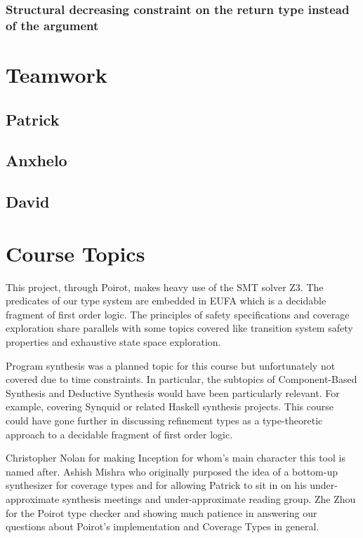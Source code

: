 \documentclass[review, sigplan]{acmart}
\begin{document}
\subsubsection{Structural decreasing constraint on the return type instead of the argument}

\section{Teamwork}

\subsection{Patrick}

\subsection{Anxhelo}

\subsection{David}

\section{Course Topics}
This project, through Poirot, makes heavy use of the SMT solver Z3. The
predicates of our type system are embedded in EUFA which is a decidable fragment
of first order logic. The principles of safety specifications and coverage
exploration share parallels with some topics covered like transition system
safety properties and exhaustive state space exploration.

Program synthesis was a planned topic for this course but unfortunately not
covered due to time constraints. In particular, the subtopics of Component-Based
Synthesis and Deductive Synthesis would have been particularly relevant. For
example, covering Synquid or related Haskell synthesis projects. This course
could have gone further in discussing refinement types as a type-theoretic
approach to a decidable fragment of first order logic.

\begin{acks}
    Christopher Nolan for making Inception for whom's main character this tool is
    named after.
    Ashish Mishra who originally purposed the idea of a bottom-up synthesizer
    for coverage types and for allowing Patrick to sit in on his
    under-approximate synthesis meetings and under-approximate reading group.
    Zhe Zhou for the Poirot type checker and showing much patience in answering
    our questions about Poirot's implementation and Coverage Types in general.
\end{acks}



\end{document}
